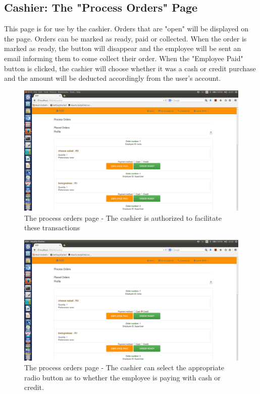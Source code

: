 \documentclass[a4paper,12pt]{report}
\begin{document}
\subsection{Cashier: The "Process Orders" Page}
This page is for use by the cashier. Orders that are "open" will be displayed on the page. Orders can be marked as ready, paid or collected. When the order is marked as ready, the button will disappear and the employee will be sent an email informing them to come collect their order. When the "Employee Paid" button is clicked, the cashier will choose whether it was a cash or credit purchase and the amount will be deducted accordingly from the user's account.

\begin{figure}[H]
  \centering
    \includegraphics[width=1.0\textwidth]{screenshots/cashier.png}
    \caption{The process orders page - The cashier is authorized to facilitate these transactions}
\end{figure}

\begin{figure}[H]
  \centering
    \includegraphics[width=1.0\textwidth]{screenshots/cashierCredit.png}
    \caption{The process orders page - The cashier can select the appropriate radio button as to whether the employee is paying with cash or credit.}
\end{figure}
\end{document}
